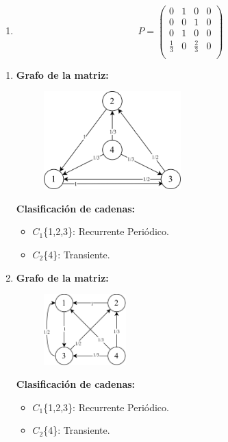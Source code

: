 \documentclass{templateNote}
\begin{document}
\begin{enumerate}
\begin{enumerate}[label=\alph*)]
        \item
        \[
        P = \left(
        \begin{array}{cccc}
            0           & 1 & 0           & 0\\
            0           & 0 & 1           & 0\\
            0           & 1 & 0           & 0\\
            \frac{1}{3} & 0 & \frac{2}{3} & 0\\
        \end{array}
        \right)
        \]
    \end{enumerate}

    \begin{enumerate}[label=\alph*)]    
        \item \textbf{Grafo de la matriz:}
        \begin{figure}[H]
            \centering
            \includegraphics[width=0.5\textwidth]{img/ejer4.png}
        \end{figure}
        \textbf{Clasificación de cadenas:}
        \begin{itemize}
            \item $C_1$\{1,2,3\}: Recurrente Periódico.
            \item $C_2$\{4\}: Transiente.
        \end{itemize}

        \item \textbf{Grafo de la matriz:}
        \begin{figure}[H]
            \centering
            \includegraphics[width=0.3\textwidth]{img/ejer42.png}
        \end{figure}
        \textbf{Clasificación de cadenas:}
        \begin{itemize}
            \item $C_1$\{1,2,3\}: Recurrente Periódico.
            \item $C_2$\{4\}: Transiente.
        \end{itemize}


\end{enumerate}
\end{enumerate}
\end{document}
